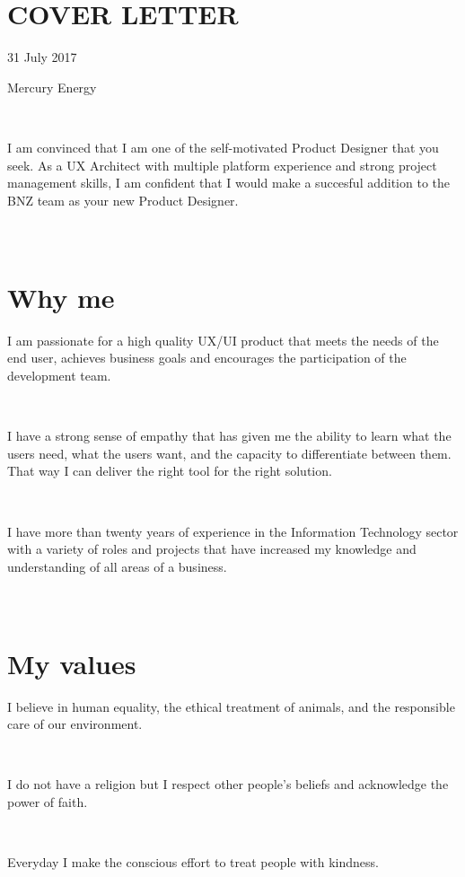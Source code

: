 \documentclass{resume}
\begin{document}



\section{\\ COVER LETTER}
  \role{}{}
  31 July 2017\par
  Mercury Energy\par
  ~\par
  I am convinced that I am one of the self-motivated Product Designer that you seek. As a UX Architect with multiple platform experience and strong project management skills, I am confident that I would make a succesful addition to the BNZ team as your new Product Designer.
  \par

\section{\\ Why me}
  \role{}{}
  I am passionate for a high quality UX/UI product that meets the needs of the end user, achieves business goals and encourages the participation of the development team.\par
  ~\par
  I have a strong sense of empathy that has given me the ability to learn what the users need, what the users want, and the capacity to differentiate between them. That way I can deliver the right tool for the right solution.\par
  ~\par
  I have more than twenty years of experience in the Information Technology sector with a variety of roles and projects that have increased my knowledge and understanding of all areas of a business.\par

\section{\\ My values}
  \role{}{}
  I believe in human equality, the ethical treatment of animals, and the responsible care of our environment.\par
  ~\par
  I do not have a religion but I respect other people's beliefs and acknowledge the power of faith.\par
  ~\par
  Everyday I make the conscious effort to treat people with kindness.\par
\end{document}
